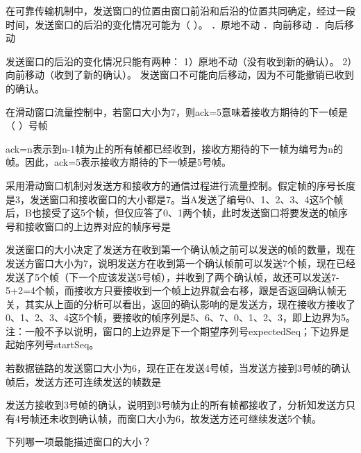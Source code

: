 \question 在可靠传输机制中，发送窗口的位置由窗口前沿和后沿的位置共同确定，经过一段时间，发送窗口的后沿的变化情况可能为（
）。 ．原地不动 ．向前移动 ．向后移动
\par{}
\begin{solution}发送窗口的后沿的变化情况只能有两种： 1）原地不动（没有收到新的确认）。
2）向前移动（收到了新的确认）。
发送窗口不可能向后移动，因为不可能撤销已收到的确认。
\end{solution}
\question 在滑动窗口流量控制中，若窗口大小为7，则ack=5意味着接收方期待的下一帧是（
）号帧
\par{}
\begin{solution}ack=n表示到n-1帧为止的所有帧都已经收到，接收方期待的下一帧为编号为n的帧。因此，ack=5表示接收方期待的下一帧是5号帧。
\end{solution}
\question 采用滑动窗口机制对发送方和接收方的通信过程进行流量控制。假定帧的序号长度是3，发送窗口和接收窗口的大小都是7。当A发送了编号0、1、2、3、4这5个帧后，B也接受了这5个帧，但仅应答了0、1两个帧，此时发送窗口将要发送的帧序号和接收窗口的上边界对应的帧序号是
\par{}
\begin{solution}发送窗口的大小决定了发送方在收到第一个确认帧之前可以发送的帧的数量，现在发送方窗口大小为7，说明发送方在收到第一个确认帧前可以发送7个帧，现在已经发送了5个帧（下一个应该发送5号帧），并收到了两个确认帧，故还可以发送7-5+2=4个帧，而接收方只要接收到一个帧上边界就会右移，跟是否返回确认帧无关，其实从上面的分析可以看出，返回的确认影响的是发送方，现在接收方接收了0、1、2、3、4这5个帧，要接收的帧序列是5、6、7、0、1、2、3，即上边界为5。
注：一般不予以说明，窗口的上边界是下一个期望序列号expectedSeq；下边界是起始序列号startSeq。
\end{solution}
\question 若数据链路的发送窗口大小为6，现在正在发送4号帧，当发送方接到3号帧的确认帧后，发送方还可连续发送的帧数是
\par{}
\begin{solution}发送方接收到3号帧的确认，说明到3号帧为止的所有帧都接收了，分析知发送方只有4号帧还未收到确认帧，而窗口大小为6，故发送方还可继续发送5个帧。
\end{solution}
\question 下列哪一项最能描述窗口的大小？
\par{}
